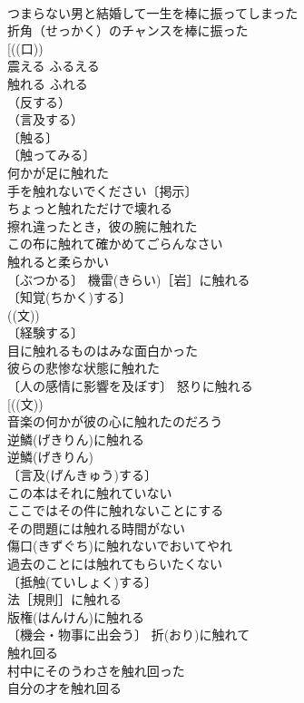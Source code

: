 \documentclass[8pt]{extreport}
\begin{document}
\begin{CJK}{UTF8}{min}
\\	つまらない男と結婚して一生を棒に振ってしまった 
\\	折角（せっかく）のチャンスを棒に振った 
\\	[((口))
\\	震える	ふるえる	
\\	触れる	ふれる	
\\	（反する）
\\	（言及する）
\\	〔触る〕
\\	〔触ってみる〕
\\	何かが足に触れた 
\\	手を触れないでください〔掲示〕 
\\	ちょっと触れただけで壊れる 
\\	擦れ違ったとき，彼の腕に触れた 
\\	この布に触れて確かめてごらんなさい 
\\	触れると柔らかい 
\\	〔ぶつかる〕 機雷(きらい)［岩］に触れる 
\\	〔知覚(ちかく)する〕
\\	((文)) 
\\	〔経験する〕
\\	目に触れるものはみな面白かった 
\\	彼らの悲惨な状態に触れた 
\\	〔人の感情に影響を及ぼす〕 怒りに触れる 
\\	[((文)) 
\\	音楽の何かが彼の心に触れたのだろう 
\\	逆鱗(げきりん)に触れる 
\\	逆鱗(げきりん)　
\\	〔言及(げんきゅう)する〕
\\	この本はそれに触れていない 
\\	ここではその件に触れないことにする 
\\	その問題には触れる時間がない 
\\	傷口(きずぐち)に触れないでおいてやれ 
\\	過去のことには触れてもらいたくない 
\\	〔抵触(ていしょく)する〕　
\\	法［規則］に触れる 
\\	版権(はんけん)に触れる 
\\	〔機会・物事に出会う〕 折(おり)に触れて 
\\	触れ回る　
\\	村中にそのうわさを触れ回った 
\\	自分の才を触れ回る 

\end{CJK}
\end{document}
